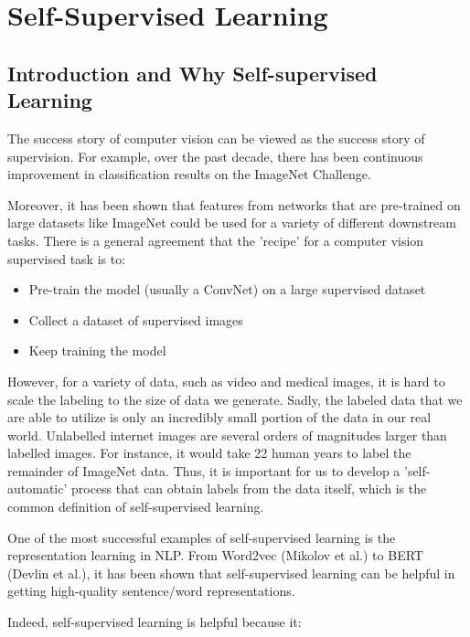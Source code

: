 \chapter{Self-Supervised Learning}

\section{Introduction and Why Self-supervised Learning}

The success story of computer vision can be viewed as the success story of supervision. For example, over the past decade, there has been continuous improvement in classification results on the ImageNet Challenge. 

Moreover, it has been shown that features from networks that are pre-trained on large datasets like ImageNet could be used for a variety of different downstream tasks. There is a general agreement that the 'recipe' for a computer vision supervised task is to:

\begin{itemize}
    \item Pre-train the model (usually a ConvNet) on a large supervised dataset
    \item Collect a dataset of supervised images
    \item Keep training the model
\end{itemize}

However, for a variety of data, such as video and medical images, it is hard to scale the labeling to the size of data we generate. Sadly, the labeled data that we are able to utilize is only an incredibly small portion of the data in our real world. Unlabelled internet images are several orders of magnitudes larger than labelled images. For instance, it would take 22 human years to label the remainder of ImageNet data. Thus, it is important for us to develop a 'self-automatic' process that can obtain labels from the data itself, which is the common definition of self-supervised learning.

One of the most successful examples of self-supervised learning is the representation learning in NLP. From  Word2vec (Mikolov et al.) to BERT (Devlin et al.), it has been shown that self-supervised learning can be helpful in getting high-quality sentence/word representations.

Indeed, self-supervised learning is helpful because it:

